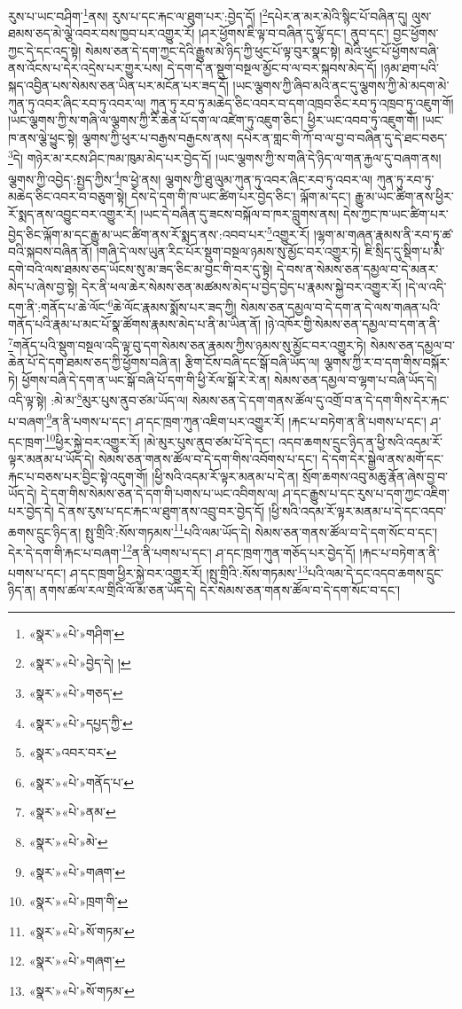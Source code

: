 རུས་པ་ཡང་བཤིག་\footnote{«སྣར་»«པེ་»གཤིག་}ནས། རུས་པ་དང་རྐང་ལ་ཐུག་པར་:བྱེད་དོ། །\footnote{«སྣར་»«པེ་»བྱེད་དེ། །}དཔེར་ན་མར་མེའི་སྙིང་པོ་བཞིན་དུ། ལུས་ཐམས་ཅད་མེ་ལྕེ་འབར་བས་ཁྱབ་པར་འགྱུར་རོ། །ཤར་ཕྱོགས་ཇི་ལྟ་བ་བཞིན་དུ་ལྷོ་དང་། ནུབ་དང་། བྱང་ཕྱོགས་ཀྱང་དེ་དང་འདྲ་སྟེ། སེམས་ཅན་དེ་དག་ཀྱང་དེའི་རྒྱུས་མེ་ཉིད་ཀྱི་ཕུང་པོ་ལྟ་བུར་སྣང་སྟེ། མེའི་ཕུང་པོ་ཕྱོགས་བཞི་ནས་འོངས་པ་དེར་འདྲེས་པར་གྱུར་པས། དེ་དག་དེ་ན་སྡུག་བསྔལ་མྱོང་བ་ལ་བར་སྐབས་མེད་དོ། །ཉམ་ཐག་པའི་སྐད་འབྱིན་པས་སེམས་ཅན་ཡིན་པར་མངོན་པར་ཟད་དོ། །ཡང་ལྕགས་ཀྱི་ཞིབ་མའི་ནང་དུ་ལྕགས་ཀྱི་མེ་མདག་མེ་ཀུན་ཏུ་འབར་ཞིང་རབ་ཏུ་འབར་ལ། ཀུན་ཏུ་རབ་ཏུ་མཆེད་ཅིང་འབར་བ་དག་འཁྲབ་ཅིང་རབ་ཏུ་འཁྲབ་ཏུ་འཇུག་གོ། །ཡང་ལྕགས་ཀྱི་ས་གཞི་ལ་ལྕགས་ཀྱི་རི་ཆེན་པོ་དག་ལ་འཛེག་ཏུ་འཇུག་ཅིང་། ཕྱིར་ཡང་འབབ་ཏུ་འཇུག་གོ། །ཡང་ཁ་ནས་ལྕེ་ཕྱུང་སྟེ། ལྕགས་ཀྱི་ཕུར་པ་བརྒྱས་བརྒྱངས་ནས། དཔེར་ན་གླང་གི་ཀོ་བ་ལ་བྱ་བ་བཞིན་དུ་དེ་ཐང་བཅད་\footnote{«སྣར་»«པེ་»གཅད་}དེ། གཉེར་མ་རངས་ཤིང་ཁམ་ཁུམ་མེད་པར་བྱེད་དོ། །ཡང་ལྕགས་ཀྱི་ས་གཞི་དེ་ཉིད་ལ་གན་རྐྱལ་དུ་བཞག་ནས། ལྕགས་ཀྱི་འབྱེད་:སྤྱད་ཀྱིས་\footnote{«སྣར་»«པེ་»དཔྱད་ཀྱི་}ཁ་ཕྱེ་ནས། ལྕགས་ཀྱི་ཐུ་ལུམ་ཀུན་ཏུ་འབར་ཞིང་རབ་ཏུ་འབར་ལ། ཀུན་ཏུ་རབ་ཏུ་མཆེད་ཅིང་འབར་བ་བཅུག་སྟེ། དེས་དེ་དག་གི་ཁ་ཡང་ཚིག་པར་བྱེད་ཅིང་། ལྐོག་མ་དང་། རྒྱུ་མ་ཡང་ཚིག་ནས་ཕྱིར་རོ་སྨད་ནས་འབྱུང་བར་འགྱུར་རོ། །ཡང་དེ་བཞིན་དུ་ཟངས་བསྐོལ་བ་ཁར་བླུགས་ནས། དེས་ཀྱང་ཁ་ཡང་ཚིག་པར་བྱེད་ཅིང་ལྐོག་མ་དང་རྒྱུ་མ་ཡང་ཚིག་ནས་རོ་སྨད་ནས་:འབབ་པར་\footnote{«སྣར་»འབར་བར་}འགྱུར་རོ། །ལྷག་མ་གཞན་རྣམས་ནི་རབ་ཏུ་ཚ་བའི་སྐབས་བཞིན་ནོ། །གཞི་དེ་ལས་ཡུན་རིང་པོར་སྡུག་བསྔལ་ཉམས་སུ་མྱོང་བར་འགྱུར་ཏེ། ཇི་སྲིད་དུ་སྡིག་པ་མི་དགེ་བའི་ལས་ཐམས་ཅད་ཡོངས་སུ་མ་ཟད་ཅིང་མ་བྱང་གི་བར་དུ་སྟེ། དེ་བས་ན་སེམས་ཅན་དམྱལ་བ་དེ་མནར་མེད་པ་ཞེས་བྱ་སྟེ། དེར་ནི་ཕལ་ཆེར་སེམས་ཅན་མཚམས་མེད་པ་བྱེད་བྱེད་པ་རྣམས་སྐྱེ་བར་འགྱུར་རོ། །དེ་ལ་འདི་དག་ནི་:གནོད་པ་ཆེ་ལོང་\footnote{«སྣར་»«པེ་»གནོད་པ་}ཆེ་ལོང་རྣམས་སྨོས་པར་ཟད་ཀྱི། སེམས་ཅན་དམྱལ་བ་དེ་དག་ན་དེ་ལས་གཞན་པའི་གནོད་པའི་རྣམ་པ་མང་པོ་སྣ་ཚོགས་རྣམས་མེད་པ་ནི་མ་ཡིན་ནོ། །ཉེ་འཁོར་གྱི་སེམས་ཅན་དམྱལ་བ་དག་ན་ནི་\footnote{«སྣར་»«པེ་»ནམ་}གནོད་པའི་སྡུག་བསྔལ་འདི་ལྟ་བུ་དག་སེམས་ཅན་རྣམས་ཀྱིས་ཉམས་སུ་མྱོང་བར་འགྱུར་ཏེ། སེམས་ཅན་དམྱལ་བ་ཆེན་པོ་དེ་དག་ཐམས་ཅད་ཀྱི་ཕྱོགས་བཞི་ན། རྩིག་ངོས་བཞི་དང་སྒོ་བཞི་ཡོད་ལ། ལྕགས་ཀྱི་ར་བ་དག་གིས་བསྐོར་ཏེ། ཕྱོགས་བཞི་དེ་དག་ན་ཡང་སྒོ་བཞི་པོ་དག་གི་ཕྱི་རོལ་སྒོ་རེ་རེ་ན། སེམས་ཅན་དམྱལ་བ་ལྷག་པ་བཞི་ཡོད་དེ། འདི་ལྟ་སྟེ། :མེ་མ་\footnote{«སྣར་»«པེ་»མེ་}མུར་པུས་ནུབ་ཙམ་ཡོད་ལ། སེམས་ཅན་དེ་དག་གནས་ཚོལ་དུ་འགྲོ་བ་ན་དེ་དག་གིས་དེར་རྐང་པ་བཞག་\footnote{«སྣར་»«པེ་»གཞག་}ན་ནི་པགས་པ་དང་། ཤ་དང་ཁྲག་ཀུན་འཇིག་པར་འགྱུར་རོ། །རྐང་པ་བཏེག་ན་ནི་པགས་པ་དང་། ཤ་དང་ཁྲག་\footnote{«སྣར་»«པེ་»ཁྲག་གི་}ཕྱིར་སྐྱེ་བར་འགྱུར་རོ། །མེ་མུར་པུས་ནུབ་ཙམ་པོ་དེ་དང་། འདབ་ཆགས་དྲུང་ཉིད་ན་ཕྱི་སའི་འདམ་རོ་ལྟར་མནམ་པ་ཡོད་དེ། སེམས་ཅན་གནས་ཚོལ་བ་དེ་དག་གིས་འབོགས་པ་དང་། དེ་དག་དེར་སྒྱེལ་ནས་མགོ་དང་རྐང་པ་བཅས་པར་བྱིང་སྟེ་འདུག་གོ། །ཕྱི་སའི་འདམ་རོ་ལྟར་མནམ་པ་དེ་ན། སྲོག་ཆགས་འབུ་མཆུ་རྣོན་ཞེས་བྱ་བ་ཡོད་དེ། དེ་དག་གིས་སེམས་ཅན་དེ་དག་གི་པགས་པ་ཡང་འབིགས་ལ། ཤ་དང་རྒྱུས་པ་དང་རུས་པ་དག་ཀྱང་འཇིག་པར་བྱེད་དེ། དེ་ནས་རུས་པ་དང་རྐང་ལ་ཐུག་ནས་འབྲུ་བར་བྱེད་དོ། །ཕྱི་སའི་འདམ་རོ་ལྟར་མནམ་པ་དེ་དང་འདབ་ཆགས་དྲུང་ཉིད་ན། སྤུ་གྲིའི་:སོས་གཏམས་\footnote{«སྣར་»«པེ་»སོ་གཏམ་}པའི་ལམ་ཡོད་དེ། སེམས་ཅན་གནས་ཚོལ་བ་དེ་དག་སོང་བ་དང་། དེར་དེ་དག་གི་རྐང་པ་བཞག་\footnote{«སྣར་»«པེ་»གཞག་}ན་ནི་པགས་པ་དང་། ཤ་དང་ཁྲག་ཀུན་གཅོད་པར་བྱེད་དོ། །རྐང་པ་བཏེག་ན་ནི་པགས་པ་དང་། ཤ་དང་ཁྲག་ཕྱིར་སྐྱེ་བར་འགྱུར་རོ། །སྤུ་གྲིའི་:སོས་གཏམས་\footnote{«སྣར་»«པེ་»སོ་གཏམ་}པའི་ལམ་དེ་དང་འདབ་ཆགས་དྲུང་ཉིད་ན། ནགས་ཚལ་རལ་གྲིའི་ལོ་མ་ཅན་ཡོད་དེ། དེར་སེམས་ཅན་གནས་ཚོལ་བ་དེ་དག་སོང་བ་དང་། 